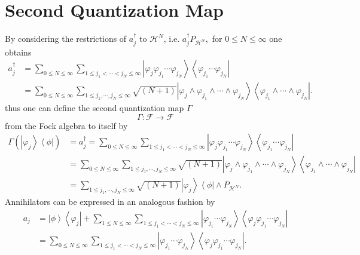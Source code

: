 \documentclass[aps,preprint,amsfonts,amssymb,showpacs,showkeys]{revtex4}%
\begin{document}
\section{Second Quantization Map \label{SecQuant}}

By considering the restrictions of $a_{j}^{\dagger}$ to $\mathcal{H}^{N}$,
i.e. $a_{j}^{\dagger}P_{\mathcal{H}^{N}},$ for $0\leq N\leq\infty$ one obtains%
\begin{align}
a_{j}^{\dagger}  &  =\sum_{0\leq N\leq\infty}\sum_{1\leq j_{1}<\cdots
<j_{N}\leq\infty}\left\vert \varphi_{j}\varphi_{j_{1}}\cdots\varphi_{j_{N}%
}\right\rangle \left\langle \varphi_{j_{1}}\cdots\varphi_{j_{N}}\right\vert
\nonumber\\
&  =\sum_{0\leq N\leq\infty}\sum_{1\leq j_{1},\cdots,j_{N}\leq\infty}%
\sqrt{\left(  N+1\right)  }\left\vert \varphi_{j}\wedge\varphi_{j_{1}}%
\wedge\cdots\wedge\varphi_{j_{N}}\right\rangle \left\langle \varphi_{j_{1}%
}\wedge\cdots\wedge\varphi_{j_{N}}\right\vert .
\end{align}
thus one can define the second quantization map $\Gamma$
\begin{equation}
\Gamma:\mathcal{F\rightarrow F}%
\end{equation}
from the Fock algebra to itself by
\begin{align}
\Gamma\left(  \left\vert \varphi_{j}\right\rangle \left\langle \phi\right\vert
\right)   &  =a_{j}^{\dagger}=\sum_{0\leq N\leq\infty}\sum_{1\leq j_{1}%
<\cdots<j_{N}\leq\infty}\left\vert \varphi_{j}\varphi_{j_{1}}\cdots
\varphi_{j_{N}}\right\rangle \left\langle \varphi_{j_{1}}\cdots\varphi_{j_{N}%
}\right\vert \nonumber\\
&  =\sum_{0\leq N\leq\infty}\sum_{1\leq j_{1},\cdots,j_{N}\leq\infty}%
\sqrt{\left(  N+1\right)  }\left\vert \varphi_{j}\wedge\varphi_{j_{1}}%
\wedge\cdots\wedge\varphi_{j_{N}}\right\rangle \left\langle \varphi_{j_{1}%
}\wedge\cdots\wedge\varphi_{j_{N}}\right\vert \nonumber\\
&  =\sum_{1\leq j_{1},\cdots,j_{N}\leq\infty}\sqrt{\left(  N+1\right)
}\left\vert \varphi_{j}\right\rangle \left\langle \phi\right\vert \wedge
P_{\mathcal{H}^{N}}.
\end{align}
Annihilators can be expressed in an analogous fashion by
\begin{align}
a_{j}  &  =\left\vert \phi\right\rangle \left\langle \varphi_{j}\right\vert
+\sum_{1\leq N\leq\infty}\sum_{1\leq j_{1}<\cdots<j_{N}\leq\infty}\left\vert
\varphi_{j_{1}}\cdots\varphi_{j_{N}}\right\rangle \left\langle \varphi
_{j}\varphi_{j_{1}}\cdots\varphi_{j_{N}}\right\vert \nonumber\\
&  =\sum_{0\leq N\leq\infty}\sum_{1\leq j_{1}<\cdots<j_{N}\leq\infty
}\left\vert \varphi_{j_{1}}\cdots\varphi_{j_{N}}\right\rangle \left\langle
\varphi_{j}\varphi_{j_{1}}\cdots\varphi_{j_{N}}\right\vert .
\end{align}
\end{document}

